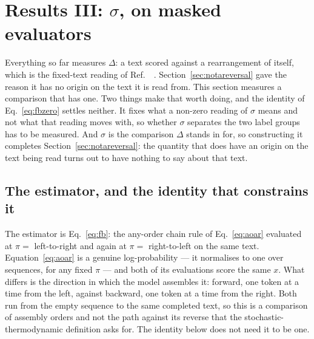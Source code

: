 %

\section{Results III: $\sigma$, on masked evaluators}
\label{sec:truesigma}

Everything so far measures $\Delta$: a text scored against a rearrangement
of itself, which is the fixed-text reading of
Ref.~\cite{sagawa2026}~\cite[Sec.~V~B]{sagawa2026}.
Section~\ref{sec:notareversal} gave the reason it has no origin on the text
it is read from.  This section measures a comparison that has one.
Two things make that worth doing, and the identity of
Eq.~\eqref{eq:fbzero} settles neither.  It fixes what a non-zero reading of
$\sigma$ means and not what that reading moves with, so whether $\sigma$
separates the two label groups has to be measured.  And $\sigma$ is the
comparison $\Delta$ stands in for, so constructing it completes
Section~\ref{sec:notareversal}: the quantity that does have an origin on
the text being read turns out to have nothing to say about that text.

\subsection{The estimator, and the identity that constrains it}
\label{sec:fbdef}

The estimator is Eq.~\eqref{eq:fb}: the any-order chain rule of
Eq.~\eqref{eq:aoar} evaluated at $\pi = $ left-to-right and again at $\pi
= $ right-to-left on the same text.  Equation~\eqref{eq:aoar} is a genuine
log-probability --- it normalises to one over sequences, for any fixed
$\pi$ --- and both of its evaluations score the same $x$.  What differs is the direction in which the
model assembles it: forward, one token at a time from the left, against
backward, one token at a time from the right.  Both run from the empty
sequence to the same completed text, so this is a comparison of assembly
orders and not the path against its reverse that the
stochastic-thermodynamic definition asks for.  The identity below does not
need it to be one.

